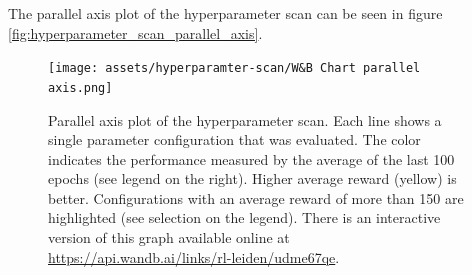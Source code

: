 \documentclass{article}
\begin{document}
The parallel axis plot of the hyperparameter scan can be seen in figure \autoref{fig:hyperparameter_scan_parallel_axis}.

\begin{figure}[ht!]
   \centering
   \texttt{[image: assets/hyperparamter-scan/W\&B Chart parallel axis.png]}
   \caption{Parallel axis plot of the hyperparameter scan. 
      Each line shows a single parameter configuration that was evaluated. 
      The color indicates the performance measured by the average of the last 100 epochs (see legend on the right). 
      Higher average reward (yellow) is better.
      Configurations with an average reward of more than 150 are highlighted (see selection on the legend).
      There is an interactive version of this graph available online at \url{https://api.wandb.ai/links/rl-leiden/udme67qe}.
   }
   \label{fig:hyperparameter_scan_parallel_axis}
\end{figure}
\end{document}
